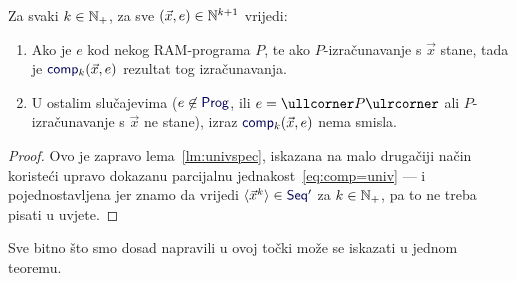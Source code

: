 \begin{korolar}\label{kor:compspec}
Za svaki $k\in{\mathbb N}_+$, za sve $(\vec x,e)\in{\mathbb N}^{k+1}$ vrijedi:
\begin{enumerate}
    \item\label{tv:comp} Ako je $e$ kod nekog RAM-programa $P$, te ako $P$-izračunavanje s $\vec x$ stane, tada je $\f{comp}_k(\vec x,e)$ rezultat tog izračunavanja.
    \item\label{tv:ncomp} U ostalim slučajevima ($e\not\in\f{Prog}$, ili $e=\kprog{P}$ ali $P$-izračunavanje s $\vec x$ ne stane), izraz $\f{comp}_k(\vec x,e)$ nema smisla.
\end{enumerate}
\end{korolar}
\begin{proof}
Ovo je zapravo lema~\ref{lm:univspec}, iskazana na malo drugačiji način koristeći upravo dokazanu parcijalnu jednakost~\eqref{eq:comp=univ} --- i pojednostavljena jer znamo da vrijedi $\langle\vec x^k\rangle\in\f{Seq}'$ za $k\in{\mathbb N}_+$, pa to ne treba pisati u uvjete.
\end{proof}

Sve bitno što smo dosad napravili u ovoj točki može se iskazati u jednom teoremu.

